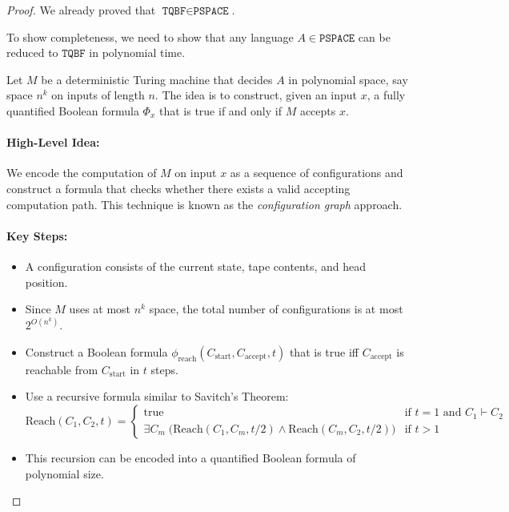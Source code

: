     \begin{proof}
    We already proved that $\texttt{TQBF} \in \texttt{PSPACE}$.
    
    To show completeness, we need to show that any language $A \in \texttt{PSPACE}$ can be reduced to $\texttt{TQBF}$ in polynomial time.
    
    Let $M$ be a deterministic Turing machine that decides $A$ in polynomial space, say space $n^k$ on inputs of length $n$. The idea is to construct, given an input $x$, a fully quantified Boolean formula $\Phi_x$ that is true if and only if $M$ accepts $x$.
    
    \paragraph{High-Level Idea:}
    We encode the computation of $M$ on input $x$ as a sequence of configurations and construct a formula that checks whether there exists a valid accepting computation path. This technique is known as the \emph{configuration graph} approach.
    
    \paragraph{Key Steps:}
    \begin{itemize}
        \item A configuration consists of the current state, tape contents, and head position.
        \item Since $M$ uses at most $n^k$ space, the total number of configurations is at most $2^{O(n^k)}$.
        \item Construct a Boolean formula $\phi_{\text{reach}}(C_{\text{start}}, C_{\text{accept}}, t)$ that is true iff $C_{\text{accept}}$ is reachable from $C_{\text{start}}$ in $t$ steps.
        \item Use a recursive formula similar to Savitch’s Theorem:
        \[
        \text{Reach}(C_1, C_2, t) =
        \begin{cases}
            \text{true} & \text{if } t = 1 \text{ and } C_1 \vdash C_2 \\
            \exists C_m \; \big(\text{Reach}(C_1, C_m, t/2) \land \text{Reach}(C_m, C_2, t/2)\big) & \text{if } t > 1
        \end{cases}
        \]
        \item This recursion can be encoded into a quantified Boolean formula of polynomial size.
    \end{itemize}
    

\end{proof}
